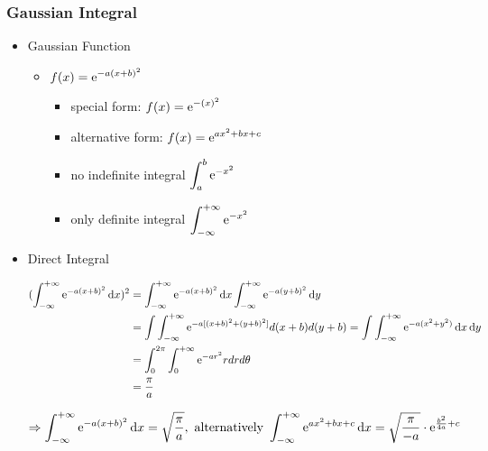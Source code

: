 \subsubsection{Gaussian Integral} \label{Math_Calc_GaussianInt}
\begin{itemize}
\item Gaussian Function
	\begin{itemize}
	\item $\displaystyle f(x) = {\rm e}^{-a(x+b)^2}$
		\begin{itemize}
		\item special form: $\displaystyle f(x) = {\rm e}^{-(x)^2}$
		\item alternative form: $\displaystyle f(x) = {\rm e}^{ax^2+bx+c}$
		\item no indefinite integral $\displaystyle \int_a^b {\rm e}^{-x^2}$
		\item only definite integral $\displaystyle \int_{-\infty}^{+\infty} {\rm e}^{-x^2}$
		\end{itemize}
	\end{itemize}
\item Direct Integral
	\begin{itemize}
	\Item \begin{align*}\displaystyle (\int^{+\infty}_{-\infty} {\rm e}^{-a(x+b)^2}\mathop{}\!\mathrm{d} x)^2 &= \int^{+\infty}_{-\infty} {\rm e}^{-a(x+b)^2}\mathop{}\!\mathrm{d} x\int^{+\infty}_{-\infty} {\rm e}^{-a(y+b)^2}\mathop{}\!\mathrm{d} y \\ &= \int\int^{+\infty}_{-\infty} {\rm e}^{-a[(x+b)^2  + (y+b)^2]}d(x+b)d(y+b) = \int\int^{+\infty}_{-\infty} {\rm e}^{-a(x^2+y^2)}\mathop{}\!\mathrm{d} x\mathop{}\!\mathrm{d} y \\ &= \int_0^{2\pi}\int_0^{+\infty} {\rm e}^{-ar^2}rdrd\theta  \\ &= \frac \pi a \end{align*}
	
	$\displaystyle \Rightarrow \int^{+\infty}_{-\infty} {\rm e}^{-a(x+b)^2}\mathop{}\!\mathrm{d} x = \sqrt{\frac \pi a}, \text{ alternatively } \int^{+\infty}_{-\infty} {\rm e}^{ax^2+bx+c}\mathop{}\!\mathrm{d} x = \sqrt{\frac {\pi} {-a}} \cdot {\rm e}^{\frac {b^2}{4a} + c}$
	\end{itemize}


\end{itemize}
